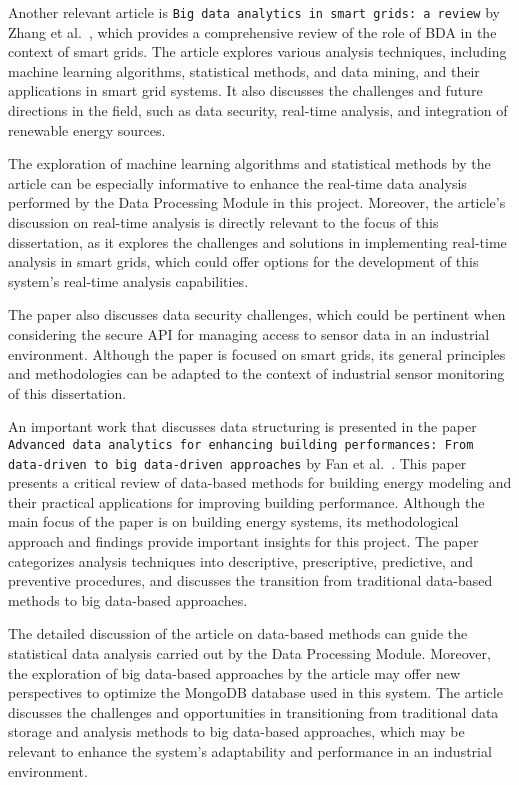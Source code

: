Another relevant article is \texttt{Big data analytics in smart grids: a review} by Zhang et al.~\cite{Zhang2018}, which provides a comprehensive review of the role of \gls{BDA} in the context of smart grids. The article explores various analysis techniques, including machine learning algorithms, statistical methods, and data mining, and their applications in smart grid systems. It also discusses the challenges and future directions in the field, such as data security, real-time analysis, and integration of renewable energy sources.

The exploration of machine learning algorithms and statistical methods by the article can be especially informative to enhance the real-time data analysis performed by the Data Processing Module in this project. Moreover, the article's discussion on real-time analysis is directly relevant to the focus of this dissertation, as it explores the challenges and solutions in implementing real-time analysis in smart grids, which could offer options for the development of this system's real-time analysis capabilities.

The paper also discusses data security challenges, which could be pertinent when considering the secure \gls{API} for managing access to sensor data in an industrial environment. Although the paper is focused on smart grids, its general principles and methodologies can be adapted to the context of industrial sensor monitoring of this dissertation.

An important work that discusses data structuring is presented in the paper \texttt{Advanced data analytics for enhancing building performances: From data-driven to big data-driven approaches} by Fan et al.~\cite{Fan2021}. This paper presents a critical review of data-based methods for building energy modeling and their practical applications for improving building performance. Although the main focus of the paper is on building energy systems, its methodological approach and findings provide important insights for this project. The paper categorizes analysis techniques into descriptive, prescriptive, predictive, and preventive procedures, and discusses the transition from traditional data-based methods to big data-based approaches.

The detailed discussion of the article on data-based methods can guide the statistical data analysis carried out by the Data Processing Module. Moreover, the exploration of big data-based approaches by the article may offer new perspectives to optimize the MongoDB database used in this system. The article discusses the challenges and opportunities in transitioning from traditional data storage and analysis methods to big data-based approaches, which may be relevant to enhance the system's adaptability and performance in an industrial environment.

